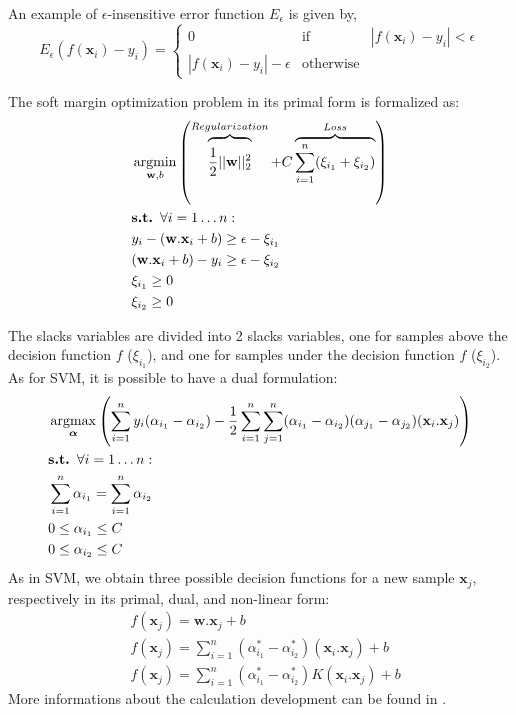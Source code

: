 \noindent An example of $\epsilon$-insensitive error function $E_{\epsilon}$ is given by,
\begin{equation}
E_{\epsilon} (f(\textbf{x}_i)-y_i) =
\left\lbrace
\begin{array}{lll}
0  								& \mbox{if} 		& |f(\textbf{x}_i)-y_i| < \epsilon\\
|f(\textbf{x}_i)-y_i|-\epsilon 	& \mbox{otherwise}  & 
\end{array}\right.
\end{equation}


\noindent The soft margin optimization problem in its primal form is formalized as:
	\begin{align}
		& \argmin_{\textbf{w},b}  \left( 
		\overbrace{\vphantom{\sum_{i=1}^n \xi_i}
			\frac{1}{2}||\textbf{w}||^2_2}^{Regularization}
		+ C \overbrace{\sum\limits_{i=1}^{n}(\xi_{i_1}+\xi_{i_2})}^{Loss}
		\right) 
		\label{eq:objectiveSVR}\\
		& \textbf{s.t. } \forall i=1 \ldots n: \nonumber\\
		& y_i-(\textbf{w}.\textbf{x}_i+b) \geq \epsilon -\xi_{i_1} \\
		& (\textbf{w}.\textbf{x}_i+b)-y_i \geq \epsilon -\xi_{i_2} \\
		&  \xi_{i_1} \geq 0 \\
		&  \xi_{i_2} \geq 0
	\end{align}

\noindent The slacks variables are divided into 2 slacks variables, one for samples above the decision function $f$ ($\xi_{i_1}$), and one for samples under the decision function $f$ ($\xi_{i_2}$). As for SVM, it is possible to have a dual formulation:
	\begin{align}
		& \argmax_{\boldsymbol{\alpha}} 
		\left( 
		\sum\limits_{i=1}^{n} y_i(\alpha_{i_1}-\alpha_{i_2})
		-\frac{1}{2} \sum\limits_{i=1}^{n} \sum\limits_{j=1}^{n} (\alpha_{i_1}-\alpha_{i_2})(\alpha_{j_1}-\alpha_{j_2}) (\textbf{x}_i.\textbf{x}_j)
		\right) \\ 
		& \textbf{s.t. } \forall i=1 \ldots n: \nonumber\\
		& \sum\limits_{i=1}^{n} \alpha_{i_1} = \sum\limits_{i=1}^{n} \alpha_{i_2} \\
		& 0 \leq \alpha_{i_1} \leq C \\
		& 0 \leq \alpha_{i_2} \leq C
	\end{align}
\noindent As in SVM, we obtain three possible decision functions for a new sample $\textbf{x}_j$, respectively in its primal, dual, and non-linear form:
\begin{align}
	& f(\textbf{x}_j) = \textbf{w}.\textbf{x}_j+b \\ 
	& f(\textbf{x}_j) = \sum\limits_{i=1}^{n} (\alpha_{i_1}^*-\alpha_{i_2}^*)(\textbf{x}_i.\textbf{x}_j) + b \\	
	& f(\textbf{x}_j) = \sum\limits_{i=1}^{n} (\alpha_{i_1}^*-\alpha_{i_2}^*)K(\textbf{x}_i.\textbf{x}_j) + b
\end{align}	
More informations about the calculation development can be found in \cite{Bishop2006}.

